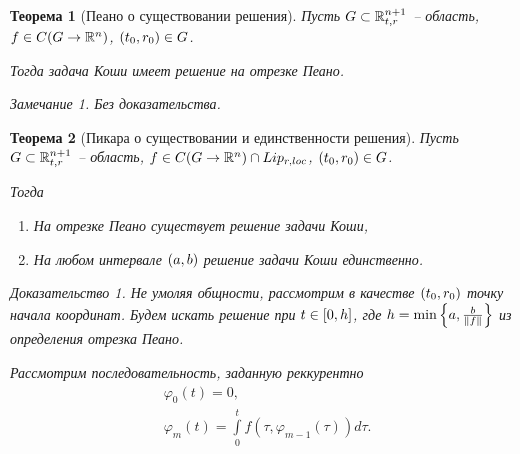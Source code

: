 \documentclass[a5paper, 10pt]{article}
\theoremstyle{definition}
\theoremstyle{plain}
\newtheorem{Th}{Теорема}
\theoremstyle{remark}
\newtheorem*{Note}{Замечание}
\newtheorem*{Proof}{Доказательство}
\begin{document}
	\begin{Th}[Пеано о существовании решения]
		Пусть $G \subset \mathbb{R}^{n+1}_{t,r}$ -- область, $f \in C(G \rightarrow \mathbb{R}^n)$, $\left(t_0, r_0\right) \in G$. 
		
		Тогда задача Коши имеет решение на отрезке Пеано.
		\begin{Note}
			Без доказательства.
		\end{Note}
	\end{Th}
	\begin{Th}[Пикара о существовании и единственности решения]
		Пусть $G \subset \mathbb{R}^{n+1}_{t,r}$ -- область, $f \in C(G \rightarrow \mathbb{R}^n) \cap Lip_{r,loc}$, $\left(t_0, r_0\right) \in G$.
		
		Тогда \begin{enumerate}
			\item На отрезке Пеано существует решение задачи Коши,
			\item На любом интервале $\left(a,b\right)$ решение задачи Коши единственно.
		\end{enumerate}
	\begin{Proof}
		Не умоляя общности, рассмотрим в качестве $\left(t_0,r_0\right)$ точку начала координат. 
		Будем искать решение при $t\in \left[0,h\right]$, где $h=\min \left\{a, \frac{b}{\|f\|}\right\}$ из определения отрезка Пеано.
		
		Рассмотрим последовательность, заданную реккурентно 
		\[
		\begin{split}
			&\varphi_0(t) = 0,\\
			&\varphi_m(t) = \int\limits_0^t f(\tau, \varphi_{m-1}(\tau))d\tau.
		\end{split}
		\]
		

\end{Proof}
\end{Th}
\end{document}

